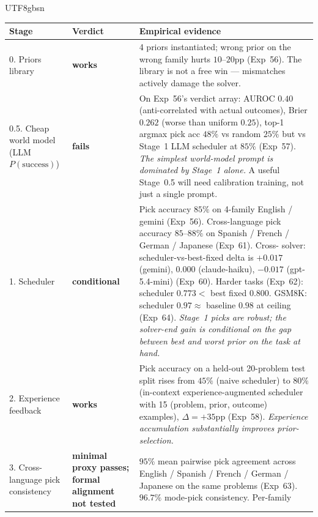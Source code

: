 \documentclass{article}
\begin{document}
\begin{CJK*}{UTF8}{gbsn}
\begin{table}[h]
\centering\small
\begin{tabular}{p{2.6cm} l p{8cm}}
  \toprule
  \textbf{Stage} & \textbf{Verdict} & \textbf{Empirical evidence} \\
  \midrule
  0. Priors library & \cellcolor{green!18}\textbf{works}
    & 4 priors instantiated; wrong prior on the wrong family
      hurts \(10\)--\(20\)pp (Exp~56). The library is not a free
      win --- mismatches actively damage the solver. \\
  \midrule
  0.5. Cheap world model
   (LLM \(P(\text{success})\)) & \cellcolor{red!18}\textbf{fails}
    & On Exp~56's verdict array: AUROC \(0.40\) (anti-correlated
      with actual outcomes), Brier \(0.262\) (worse than uniform
      \(0.25\)), top-1 argmax pick acc \(48\%\) vs random
      \(25\%\) but vs Stage~1 LLM scheduler at \(85\%\) (Exp~57).
      \emph{The simplest world-model prompt is dominated by
      Stage~1 alone.} A useful Stage~0.5 will need calibration
      training, not just a single prompt. \\
  \midrule
  1. Scheduler & \cellcolor{yellow!18}\textbf{conditional}
    & Pick accuracy \(85\%\) on 4-family English / gemini
      (Exp~56). Cross-language pick accuracy \(85\)--\(88\%\) on
      Spanish / French / German / Japanese (Exp~61). Cross-
      solver: scheduler-vs-best-fixed delta is
      \(+0.017\) (gemini), \(0.000\) (claude-haiku), \(-0.017\)
      (gpt-5.4-mini) (Exp~60). Harder tasks (Exp~62): scheduler
      \(0.773 < \) best fixed \(0.800\). GSM8K: scheduler
      \(0.97 \approx\) baseline \(0.98\) at ceiling (Exp~64).
      \emph{Stage~1 picks are robust; the solver-end gain is
      conditional on the gap between best and worst prior on the
      task at hand.} \\
  \midrule
  2. Experience feedback & \cellcolor{green!18}\textbf{works}
    & Pick accuracy on a held-out 20-problem test split rises
      from \(45\%\) (naive scheduler) to \(80\%\) (in-context
      experience-augmented scheduler with 15 (problem, prior,
      outcome) examples), \(\Delta = +35\)pp (Exp~58).
      \emph{Experience accumulation substantially improves
      prior-selection.} \\
  \midrule
  3. Cross-language pick consistency
    & \cellcolor{yellow!22}\textbf{minimal proxy passes;
      formal alignment not tested}
    & \(95\%\) mean pairwise pick agreement across English /
      Spanish / French / German / Japanese on the same problems
      (Exp~63). \(96.7\%\) mode-pick consistency. Per-family

\end{tabular}
\end{table}
\end{CJK*}
\end{document}
